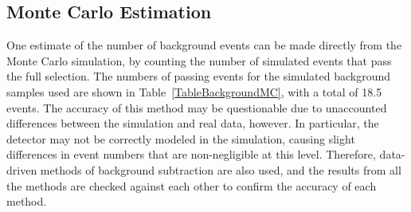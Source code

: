 

\subsection{Monte Carlo Estimation}
\label{anMeth:BGSubMC}
One estimate of the number of background events can be made 
directly from the Monte Carlo simulation, 
by counting the number of simulated events that pass 
the full selection.  
The numbers of passing events for the simulated background 
samples used are shown in Table~\ref{TableBackgroundMC}, 
with a total of 18.5 events.  
The accuracy of this method may be questionable due to 
unaccounted differences between the simulation and real data, however.  
In particular, 
the detector may not be correctly modeled in the simulation, 
causing slight differences in event numbers 
that are non-negligible at this level.  
Therefore, data-driven methods of background subtraction 
are also used, 
and the results from all the methods are checked against each other 
to confirm the accuracy of each method.  


